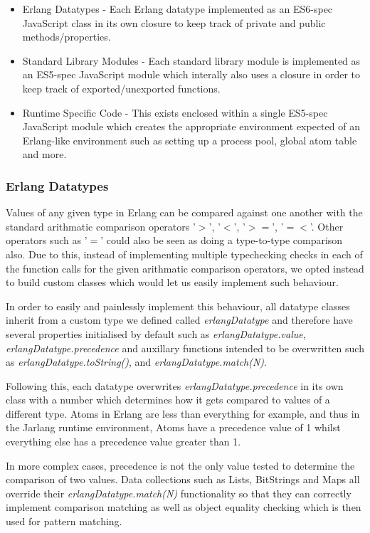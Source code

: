 \documentclass[twoside,12pt,titlepage,a4paper]{article}
\begin{document}
\begin{itemize}
	\item Erlang Datatypes - Each Erlang datatype implemented as an ES6-spec JavaScript class in its own closure to keep track of private and public methods/properties.
	\item Standard Library Modules - Each standard library module is implemented as an ES5-spec JavaScript module which interally also uses a closure in order to keep track of exported/unexported functions.
	\item Runtime Specific Code - This exists enclosed within a single ES5-spec JavaScript module which creates the appropriate environment expected of an Erlang-like environment such as setting up a process pool, global atom table and more.
\end{itemize}

\subsubsection{Erlang Datatypes}
Values of any given type in Erlang can be compared against one another with the standard arithmatic comparison operators '$>$', '$<$', '$>=$', '$=<$'. Other operators such as '$=$' could also be seen as doing a type-to-type comparison also. Due to this, instead of implementing multiple typechecking checks in each of the function calls for the given arithmatic comparison operators, we opted instead to build custom classes which would let us easily implement such behaviour.

In order to easily and painlessly implement this behaviour, all datatype classes inherit from a custom type we defined called \textit{erlangDatatype} and therefore have several properties initialised by default such as \textit{erlangDatatype.value}, \textit{erlangDatatype.precedence} and auxillary functions intended to be overwritten such as \textit{erlangDatatype.toString()}, and \textit{erlangDatatype.match(N)}.

Following this, each datatype overwrites \textit{erlangDatatype.precedence} in its own class with a number which determines how it gets compared to values of a different type. Atoms in Erlang are less than everything for example, and thus in the Jarlang runtime environment, Atoms have a precedence value of 1 whilst everything else has a precedence value greater than 1.

In more complex cases, precedence is not the only value tested to determine the comparison of two values. Data collections such as Lists, BitStrings and Maps all override their \textit{erlangDatatype.match(N)} functionality so that they can correctly implement comparison matching as well as object equality checking which is then used for pattern matching.
\end{document}
